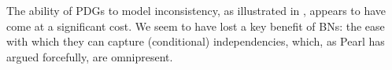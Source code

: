 \documentclass{article}
\theoremstyle{plain}
\theoremstyle{definition}
\theoremstyle{remark}
\numberwithin{equation}{section}
\begin{document}
The ability of PDGs to model inconsistency, as illustrated in
, appears to have come at a significant cost. We seem
to have lost a key benefit of BNs: the ease with which they can capture
(conditional) independencies, which, as Pearl \cite{pearl1989conditional} has
argued forcefully, are omnipresent.

	
\end{document}

